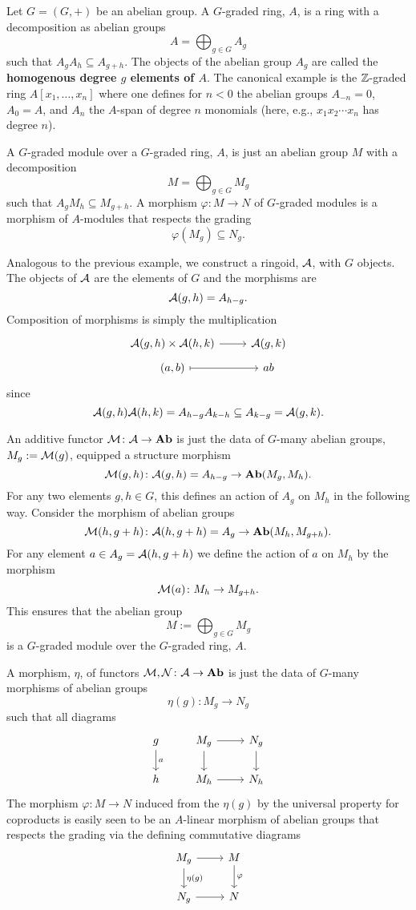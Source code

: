 \documentclass[reqno, 12pt]{amsart}
\begin{document}
\begin{example}
  Let $G = (G,+)$ be an abelian group.
  A $G$-graded ring, $A$, is a ring with a decomposition as abelian groups
  $$A = \bigoplus_{g \in G} A_g$$
  such that $A_g A_h \subseteq A_{g + h}$.
  The objects of the abelian group $A_g$ are called the \textbf{homogenous degree $g$ elements of $A$}.
  The canonical example is the $\mathbb{Z}$-graded ring $A[x_1, \ldots, x_n]$ where one defines for $n < 0$ the abelian groups $A_{-n} = 0$, $A_0 = A$, and $A_n$ the $A$-span of degree $n$ monomials (here, e.g., $x_1x_2\cdots x_n$ has degree $n$).

  A $G$-graded module over a $G$-graded ring, $A$, is just an abelian group $M$ with a decomposition
  $$M = \bigoplus_{g \in G} M_g$$
  such that $A_g M_h \subseteq M_{g + h}$.
  A morphism $\varphi \colon M \to N$ of $G$-graded modules is a morphism of $A$-modules that respects the grading
  $$\varphi(M_g) \subseteq N_g.$$
  
  Analogous to the previous example, we construct a ringoid, $\mathcal{A}$, with $G$ objects.
  The objects of $\mathcal{A}$ are the elements of $G$ and the morphisms are
  $$\mathcal{A}(g,h) = A_{h - g}.$$
  Composition of morphisms is simply the multiplication
  $$\begin{tikzcd}[row sep=tiny]
    \A(g,h) \times \A(h,k) \arrow{r} & \A(g,k)\\
    (a,b) \arrow[mapsto]{r} & ab
  \end{tikzcd}$$
  since
  $$\mathcal{A}(g,h)\mathcal{A}(h,k) = A_{h - g}A_{k - h} \subseteq A_{k - g} = \mathcal{A}(g,k).$$

  An additive functor $\mathcal{M} \colon \mathcal{A} \to \operatorname{\bf Ab}$ is just the data of $G$-many abelian groups, $M_g := \mathcal{M}(g)$, equipped a structure morphism
  $$\mathcal{M}(g,h) \colon \mathcal{A}(g,h) = A_{h - g} \to \operatorname{\bf Ab}(M_g, M_h).$$
  For any two elements $g,h \in G$, this defines an action of $A_g$ on $M_h$ in the following way.
  Consider the morphism of abelian groups
  $$\mathcal{M}(h,g + h) \colon \mathcal{A}(h,g+h) = A_{g} \to \operatorname{\bf Ab}(M_h, M_{g + h}).$$
  For any element $a \in A_g = \mathcal{A}(h,g+h)$ we define the action of $a$ on $M_h$ by the morphism
  $$\mathcal{M}(a) \colon M_h \to M_{g + h}.$$
  This ensures that the abelian group
  $$M := \bigoplus_{g \in G} M_g$$
  is a $G$-graded module over the $G$-graded ring, $A$.

  A morphism, $\eta$, of functors $\mathcal{M},\mathcal{N} \colon \mathcal{A} \to \operatorname{\bf Ab}$ is just the data of $G$-many morphisms of abelian groups
  $$\eta(g) \colon M_g \to N_g$$
  such that all diagrams
  $$\begin{tikzcd}
    g\arrow{d}{a} & M_g\arrow{d}\arrow{r} & N_g\arrow{d}\\
    h & M_h\arrow{r} & N_h
  \end{tikzcd}$$
  The morphism $\varphi \colon M \to N$ induced from the $\eta(g)$ by the universal property for coproducts is easily seen to be an $A$-linear morphism of abelian groups that respects the grading via the defining commutative diagrams
  $$\begin{tikzcd}
    M_g \arrow{r}\arrow{d}{\eta(g)} & M\arrow{d}{\varphi}\\
    N_g \arrow{r} & N 
  \end{tikzcd}$$
\end{example}
\end{document}
